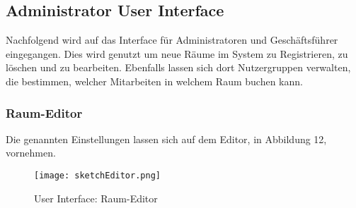 \subsection{Administrator User Interface}

Nachfolgend wird auf das Interface für Administratoren und Geschäftsführer eingegangen. 
Dies wird genutzt um neue Räume im System zu Registrieren, zu löschen und zu bearbeiten.
Ebenfalls lassen sich dort Nutzergruppen verwalten, die bestimmen, welcher Mitarbeiten in welchem Raum buchen kann. 

\newpage
\subsubsection{Raum-Editor}
Die genannten Einstellungen lassen sich auf dem Editor, in Abbildung 12, vornehmen.

\begin{figure}[!h]
  \centering
  \texttt{[image: sketchEditor.png]}
  \caption{User Interface: Raum-Editor}
  \label{fig:sketch_RaumEditor}
\end{figure}